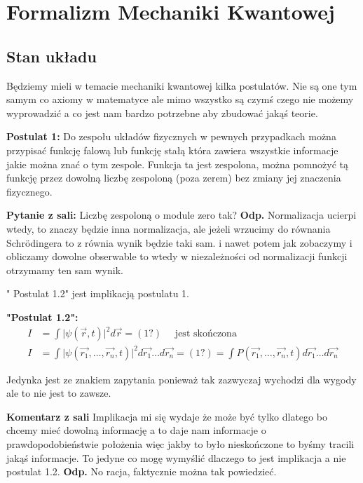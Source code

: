 \section{Formalizm Mechaniki Kwantowej}
\subsection{Stan układu}
Będziemy mieli w temacie mechaniki kwantowej kilka postulatów. Nie są one tym samym co axiomy w matematyce ale mimo wszystko są czymś czego nie możemy wyprowadzić a co jest nam bardzo potrzebne aby zbudować jakąś teorie.

\textbf{Postulat 1:} Do zespołu układów fizycznych w pewnych przypadkach można przypisać funkcję falową lub funkcję stałą która zawiera wszystkie informacje jakie można znać o tym zespole. Funkcja ta jest zespolona, można pomnożyć tą funkcję przez dowolną liczbę zespoloną (poza zerem) bez zmiany jej znaczenia fizycznego.

\textbf{Pytanie z sali:} Liczbę zespoloną o module zero tak? \textbf{Odp.} Normalizacja ucierpi wtedy, to znaczy będzie inna normalizacja, ale jeżeli wrzucimy do równania Schrödingera to z równia wynik będzie taki sam. i nawet potem jak zobaczymy i obliczamy dowolne obserwable to wtedy w niezależności od normalizacji funkcji otrzymamy ten sam wynik.

" Postulat 1.2" \hspace{1pt} jest implikacją postulatu 1.

\textbf{"Postulat 1.2":}
\begin{equation*}
	\begin{split}
		I &= \int \vert \psi(\vec{r}, t)\vert^2 d\vec{r} = (1?) \quad \text{ jest skończona} \\
		I &= \int \vert \psi (\vec{r_1}, \dots, \vec{r_n}, t)\vert^2 d\vec{r_1}\dots d\vec{r_n} = (1?) = \int P(\vec{r_1}, \dots, \vec{r_n}, t)d\vec{r_1}\dots d\vec{r_n}
	\end{split}
\end{equation*}

Jedynka jest ze znakiem zapytania ponieważ tak zazwyczaj wychodzi dla wygody ale to nie jest to zawsze.

\textbf{Komentarz z sali} Implikacja mi się wydaje że może być tylko dlatego bo chcemy mieć dowolną informację a to daje nam informacje o prawdopodobieństwie położenia więc jakby to było nieskończone to byśmy tracili jakąś informacje. To jedyne co mogę wymyślić dlaczego to jest implikacja a nie postulat 1.2. \textbf{Odp.} No racja, faktycznie można tak powiedzieć.

